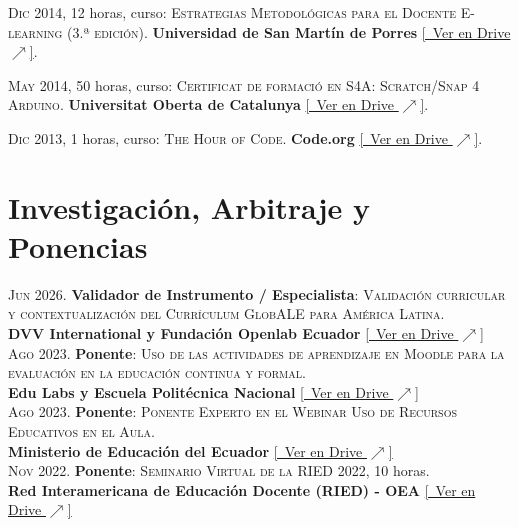 \documentclass[a4paper]{article}
\begin{document}
\textsc{Dic} 2014, 12 horas, curso: \textsc{Estrategias Metodológicas para el Docente E-learning (3.ª edición)}.
\textbf{Universidad de San Martín de Porres} \small \href{https://drive.google.com/file/d/1_pMO9YDUSRiYU6iXX1AK-NhtcnkRPuL4/view}{[\faGoogleDrive~Ver en Drive $\nearrow$]}.

\textsc{May} 2014, 50 horas, curso: \textsc{Certificat de formació en S4A: Scratch/Snap 4 Arduino}.
\textbf{Universitat Oberta de Catalunya} \small \href{https://drive.google.com/file/d/1TRbBIgjkDgO5JOuoW__wq5JO4k4xq9T2/view}{[\faGoogleDrive~Ver en Drive $\nearrow$]}.

\textsc{Dic} 2013, 1 horas, curso: \textsc{The Hour of Code}.
\textbf{Code.org} \small \href{https://drive.google.com/file/d/1RnSVghc-1QjKRHdYPQcwtWltksbT3J0f/view}{[\faGoogleDrive~Ver en Drive $\nearrow$]}.

\section{Investigación, Arbitraje y Ponencias}

\textsc{Jun} 2026. \textbf{Validador de Instrumento / Especialista}: \textsc{Validación curricular y contextualización del Currículum GlobALE para América Latina}.\\
\textbf{DVV International y Fundación Openlab Ecuador} \small \href{https://drive.google.com/file/d/12DzyOfBLhJo0I0CAnCjj44SS-7GUat87/view}{[\faGoogleDrive~Ver en Drive $\nearrow$]} \\[4pt]

\textsc{Ago} 2023. \textbf{Ponente}: \textsc{Uso de las actividades de aprendizaje en Moodle para la evaluación en la educación continua y formal}.\\
\textbf{Edu Labs y Escuela Politécnica Nacional} \small \href{https://drive.google.com/file/d/1z9RVjEkmRR_Dmp4KkF_e-GHY-2KXLug4/view}{[\faGoogleDrive~Ver en Drive $\nearrow$]} \\[4pt]

\textsc{Ago} 2023. \textbf{Ponente}: \textsc{Ponente Experto en el Webinar Uso de Recursos Educativos en el Aula}.\\
\textbf{Ministerio de Educación del Ecuador} \small \href{https://drive.google.com/file/d/12555hYM_qgzC2S6fxhfgwVpQs_AlXJsR/view}{[\faGoogleDrive~Ver en Drive $\nearrow$]} \\[4pt]

\textsc{Nov} 2022. \textbf{Ponente}: \textsc{Seminario Virtual de la RIED 2022}, 10 horas.\\
\textbf{Red Interamericana de Educación Docente (RIED) - OEA} \small \href{https://drive.google.com/file/d/1u_iAl5tjslVdbdlPmY4mRomJHAkemjK_/view}{[\faGoogleDrive~Ver en Drive $\nearrow$]} \\[4pt]
\end{document}
